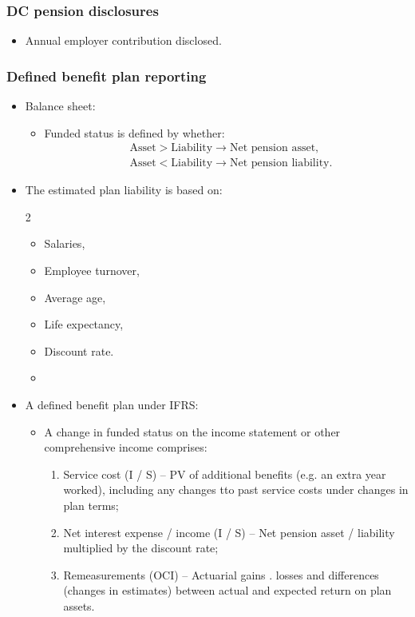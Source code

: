 \documentclass[../notes_compiled.tex]{subfiles}
\begin{document}
\subsubsection{DC pension disclosures}
\begin{itemize}
\item Annual employer contribution disclosed.
\end{itemize}

\subsubsection{Defined benefit plan reporting}
\begin{itemize}
\item Balance sheet:
\begin{itemize}
\item Funded status is defined by whether:
\begin{align*}
&\text{Asset} > \text{Liability} \longrightarrow \text{Net pension asset}, \\
&\text{Asset} < \text{Liability} \longrightarrow \text{Net pension liability}.
\end{align*}
\end{itemize}
\item The estimated plan liability is based on:
\begin{multicols}{2}
\begin{itemize}
\item Salaries,
\item Employee turnover,
\item Average age,
\item Life expectancy,
\item Discount rate.
 \item[]
\end{itemize}
\end{multicols}
\item A defined benefit plan under IFRS:
\begin{itemize}
\item A change in funded status on the income statement or other comprehensive income comprises:
\begin{enumerate}
\item Service cost (I / S) -- PV of additional benefits (e.g. an extra year worked), including any changes tto past service costs under changes in plan terms;
\item Net interest expense / income (I / S) -- Net pension asset / liability multiplied by the discount rate;
\item Remeasurements (OCI) -- Actuarial gains . losses and differences (changes in estimates) between actual and expected return on plan assets.
\end{enumerate}
\end{itemize}


\end{itemize}
\end{document}
